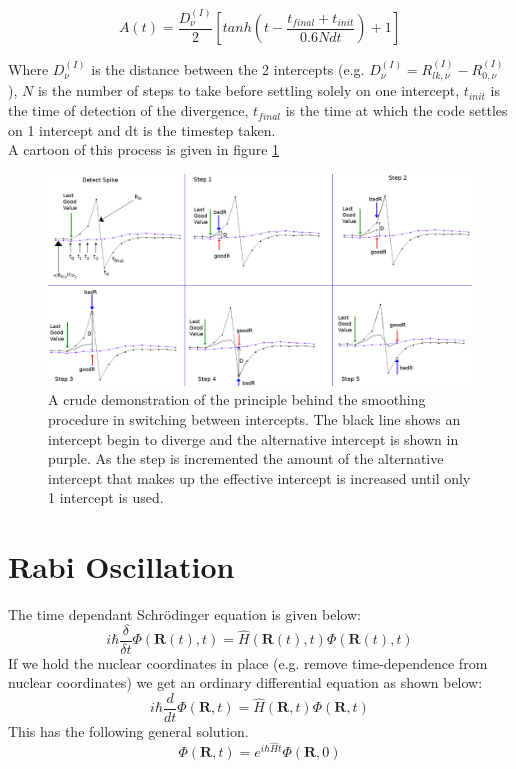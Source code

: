 \begin{equation}
	A(t) = \frac{D_{\nu}^{(I)}}{2} \left[ tanh\left( t - \frac{t_{final} + t_{init}}{0.6 N dt} \right) + 1 \right]
	\label{eq:tanhSmoothParam}
\end{equation}

Where $D_{\nu}^{(I)}$ is the distance between the 2 intercepts (e.g. $D_{\nu}^{(I)} = R_{lk, \nu}^{(I)} - R_{0, \nu}^{(I)}$), $N$ is the number of steps to take before settling solely on one intercept, $t_{init}$ is the time of detection of the divergence, $t_{final}$ is the time at which the code settles on 1 intercept and dt is the timestep taken.
\\
A cartoon of this process is given in figure \ref{fig:tanh_explan}
\begin{figure}[h]
	\includegraphics[width=\textwidth]{./img/CTMQC/tanh_explanation.png}
	\caption{\label{fig:tanh_explan}A crude demonstration of the principle behind the smoothing procedure in switching between intercepts. The black line shows an intercept begin to diverge and the alternative intercept is shown in purple. As the step is incremented the amount of the alternative intercept that makes up the effective intercept is increased until only 1 intercept is used.}
\end{figure}


\chapter{Rabi Oscillation \label{ap:Rabi}}
The time dependant Schr\"odinger equation is given below:
\begin{equation}
	i \hbar \frac{\delta}{\delta t} \Phi(\textbf{R}(t), t) = \hat{H}(\textbf{R}(t), t) \Phi(\textbf{R}(t), t)
\end{equation}
If we hold the nuclear coordinates in place (e.g. remove time-dependence from nuclear coordinates) we get an ordinary differential equation as shown below:
\begin{equation}
	i \hbar \frac{d}{d t} \Phi(\mathbf{R}, t) = \hat{H}(\mathbf{R}, t) \Phi(\mathbf{R}, t)
\end{equation}
This has the following general solution.
\[\Phi(\mathbf{R}, t) = e^{i \hbar \hat{H}t} \Phi(\mathbf{R}, 0)\]









